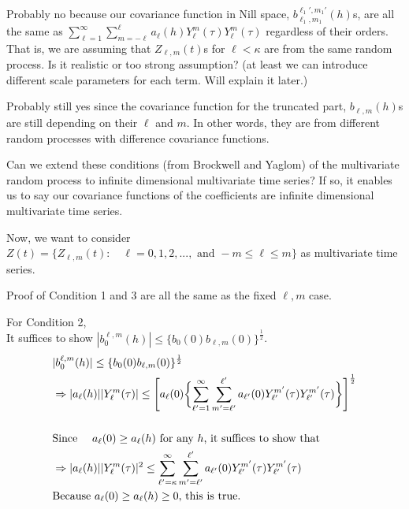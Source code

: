 \documentclass[11pt]{article}
\begin{document}
\begin{itemize}
{\item 
Probably no because our covariance function in Nill space, $b_{\ell_1,m_1}^{\ell_1',m_1'}(h)$s, are all the same as $\sum_{\ell=1}^{\infty} \sum_{m=-\ell}^{\ell} a_{\ell}(h) Y_{\ell}^{m}(\tau) Y_{\ell}^{m}(\tau)$ regardless of their orders. That is, we are assuming that $Z_{\ell,m}(t)$s for $\ell<\kappa$ are from the same random process. Is it realistic or too strong assumption? (at least we can introduce different scale parameters for each term. Will explain it later.) 

\item
Probably still yes since the covariance function for the truncated part, $b_{\ell,m}(h)$s are still depending on their $\ell$ and $m$. In other words, they are from different random processes with difference covariance functions.\\

\item 
Can we extend these conditions (from Brockwell and Yaglom) of the multivariate random process to infinite dimensional multivariate time series? If so, it enables us to say our covariance functions of the coefficients are infinite dimensional multivariate time series.\\
}

\pagebreak

\item
Now, we want to consider $Z(t) = \{Z_{\ell,m}(t): \quad \ell=0,1,2,..., \text{ and } -m \le \ell \le m \}$ as multivariate time series.\\

\item
Proof of Condition 1 and 3 are all the same as the fixed $\ell,m$ case.\\

\item
For Condition 2,\\
It suffices to show $|b_{0}^{\ell,m}(h)| \le \{b_{0}(0) b_{\ell,m}(0)\}^\frac{1}{2}$.\\
\begin{align*}
&|b_{0}^{\ell,m}(h)| \le \{b_{0}(0) b_{\ell,m}(0)\}^\frac{1}{2}\\
&\Rightarrow |a_{\ell}(h)||Y_{\ell}^{m}(\tau)| \le \Biggl[ a_{\ell}(0) \biggl\{ \sum_{{\ell}'=1}^{\infty} \sum_{m'=\ell'}^{\ell'} a_{{\ell}'}(0) Y_{{\ell}'}^{{m}'}(\tau) Y_{{\ell}'}^{{m}'}(\tau) \biggl\} \Biggl]^\frac{1}{2}\\
\\
&\text{Since \quad $a_{\ell}(0) \ge a_{\ell}(h)$ for any $h$, it suffices to show that }\\
&\Rightarrow |a_{\ell}(h)||Y_{\ell}^{m}(\tau)|^2 \le \sum_{{\ell}'=\kappa}^{\infty} \sum_{m'=\ell'}^{\ell'} a_{{\ell}'}(0) Y_{{\ell}'}^{{m}'}(\tau) Y_{{\ell}'}^{{m}'}(\tau)\\
&\text{Because $a_\ell(0) \ge a_\ell(h)  \ge 0$, this is true.}\\
\end{align*}


\end{itemize}
\end{document}
